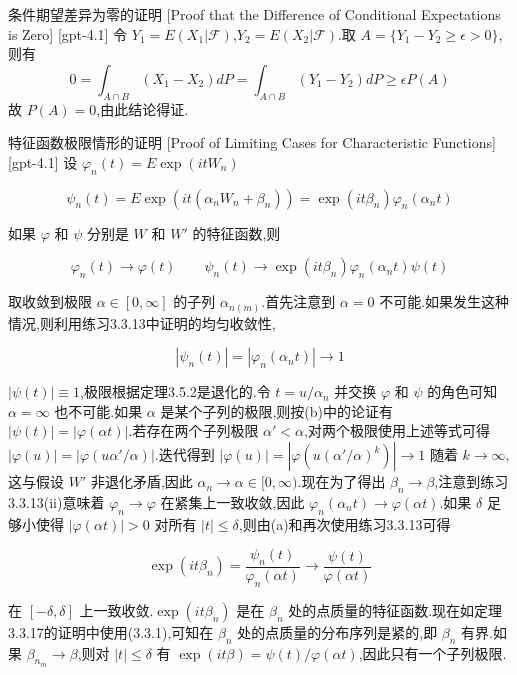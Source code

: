 \documentclass[UTF8]{ctexart}
\begin{document}
    
    
    \begin{prf}
        {条件期望差异为零的证明}
        [Proof that the Difference of Conditional Expectations is Zero]
        [gpt-4.1]
        令 $Y _ { 1 } = E ( X _ { 1 } | \mathcal { F } )$,$Y _ { 2 } = E ( X _ { 2 } | \mathcal { F } )$.取 $A = \{ Y _ { 1 } - Y _ { 2 } \geq \epsilon > 0 \}$,则有
\[
0 = \int _ { A \cap B } ( X _ { 1 } - X _ { 2 } ) d P = \int _ { A \cap B } ( Y _ { 1 } - Y _ { 2 } ) d P \geq \epsilon P ( A )
\]
故 $P ( A ) = 0$,由此结论得证.

    \end{prf}
    
    
    
    \begin{prf}
        {特征函数极限情形的证明}
        [Proof of Limiting Cases for Characteristic Functions]
        [gpt-4.1]
        设 $\varphi_{n}(t) = E \exp(i t W_{n})$

\[
\psi_{n}(t) = E \exp(i t (\alpha_{n} W_{n} + \beta_{n})) = \exp(i t \beta_{n}) \varphi_{n}(\alpha_{n} t)
\]

如果 $\varphi$ 和 $\psi$ 分别是 $W$ 和 $W'$ 的特征函数,则

\[
\varphi_{n}(t) \to \varphi(t) \qquad \psi_{n}(t) \to \exp(i t \beta_{n}) \varphi_{n}(\alpha_{n} t) \psi(t)
\]

取收敛到极限 $\alpha \in [0, \infty]$ 的子列 $\alpha_{n(m)}$.首先注意到 $\alpha = 0$ 不可能.如果发生这种情况,则利用练习3.3.13中证明的均匀收敛性,

\[
|\psi_{n}(t)| = |\varphi_{n}(\alpha_{n} t)| \to 1
\]

$|\psi(t)| \equiv 1$,极限根据定理3.5.2是退化的.令 $t = u / \alpha_{n}$ 并交换 $\varphi$ 和 $\psi$ 的角色可知 $\alpha = \infty$ 也不可能.如果 $\alpha$ 是某个子列的极限,则按(b)中的论证有 $|\psi(t)| = |\varphi(\alpha t)|$.若存在两个子列极限 $\alpha' < \alpha$,对两个极限使用上述等式可得 $|\varphi(u)| = |\varphi(u \alpha' / \alpha)|$.迭代得到 $|\varphi(u)| = |\varphi(u (\alpha'/\alpha)^k)| \to 1$ 随着 $k \to \infty$,这与假设 $W'$ 非退化矛盾,因此 $\alpha_{n} \to \alpha \in [0, \infty)$.现在为了得出 $\beta_{n} \to \beta$,注意到练习3.3.13(ii)意味着 $\varphi_{n} \to \varphi$ 在紧集上一致收敛,因此 $\varphi_{n}(\alpha_{n} t) \to \varphi(\alpha t)$.如果 $\delta$ 足够小使得 $|\varphi(\alpha t)| > 0$ 对所有 $|t| \leq \delta$,则由(a)和再次使用练习3.3.13可得

\[
\exp(i t \beta_{n}) = \frac{\psi_{n}(t)}{\varphi_{n}(\alpha t)} \to \frac{\psi(t)}{\varphi(\alpha t)}
\]

在 $[-\delta, \delta]$ 上一致收敛.$\exp(i t \beta_{n})$ 是在 $\beta_{n}$ 处的点质量的特征函数.现在如定理3.3.17的证明中使用(3.3.1),可知在 $\beta_{n}$ 处的点质量的分布序列是紧的,即 $\beta_{n}$ 有界.如果 $\beta_{n_{m}} \to \beta$,则对 $|t| \leq \delta$ 有 $\exp(i t \beta) = \psi(t) / \varphi(\alpha t)$,因此只有一个子列极限.

    \end{prf}
    
\end{document}
